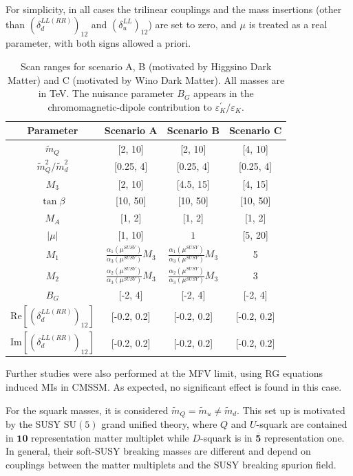 For simplicity, in all cases the trilinear couplings and the mass insertions (other than $\left(\delta_{d}^{LL(RR)}\right)_{12}$ and $\left( \delta_{u}^{LL} \right)_{12}$) are set to zero, and $\mu$ is treated as a real parameter, with both signs allowed a priori.

\begin{table}[t!]
\begin{center}
\begin{tabular}{cccc}
Parameter & Scenario A & Scenario B & Scenario C \\
\hline 
$\tilde{m}_{Q}$ & [2, 10] & [2, 10] & [4, 10]  \\
$\tilde{m}_{Q}^2/\tilde{m}_{d}^2$ & [0.25, 4] & [0.25, 4] & [0.25, 4] \\
$M_3$ & [2, 10] & [4.5, 15] & [4, 15] \\
$\tan\beta$ & [10, 50] & [10, 50] & [10, 50] \\
$M_A$ & [1, 2] & [1, 2] & [1, 2] \\
$|\mu|$ & [1, 10] & $1$ & [5, 20]\\
$M_1$ & $\frac{\alpha_1(\mu^{SUSY})}{\alpha_3(\mu^{SUSY})}M_3$ & $\frac{\alpha_1(\mu^{SUSY})}{\alpha_3(\mu^{SUSY})}M_3$ & 5 \\
$M_2$ & $\frac{\alpha_2(\mu^{SUSY})}{\alpha_3(\mu^{SUSY})}M_3$ & $\frac{\alpha_2(\mu^{SUSY})}{\alpha_3(\mu^{SUSY})}M_3$ & 3 \\
$B_G$ & [-2, 4] & [-2, 4] & [-2, 4]\\
$\textrm{Re}\left[(\delta_{d}^{LL(RR)})_{12}\right]$& [-0.2, 0.2] & [-0.2, 0.2] & [-0.2, 0.2] \\
$\textrm{Im}\left[(\delta_{d}^{LL(RR)})_{12}\right]$& [-0.2, 0.2] & [-0.2, 0.2] & [-0.2, 0.2] \\
\hline 
\end{tabular}
\caption{\label{tab:AllScenarios}Scan ranges for scenario A, B (motivated by Higgsino Dark Matter) and C (motivated by Wino Dark Matter). All masses are in TeV. The nuisance parameter $B_G$ appears in the chromomagnetic-dipole contribution to $\varepsilon^{\prime}_K/\varepsilon_K$.}
\end{center}
\end{table}

Further studies were also performed at the MFV limit, using RG equations induced MIs in CMSSM. As expected, no significant effect is found in this case.

For the squark masses, it is considered  $\tilde{m}_{Q} = \tilde{m}_{u} \neq \tilde{m}_{d}$. This set up is motivated by the SUSY $\textrm{SU}(5)$ grand unified theory, where $Q$ and $U$-squark are contained in $\mathbf{10}$ representation matter multiplet  
while $D$-squark is in  $\mathbf{\overline{5}}$ representation one. In general, their soft-SUSY breaking masses are different and depend on couplings between the matter multiplets and the SUSY breaking spurion field.


